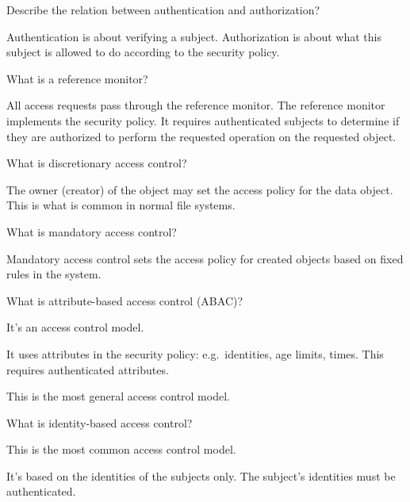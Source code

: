 \question[3] Describe the relation between authentication and authorization?

\begin{solution}
  Authentication is about verifying a subject.
  Authorization is about what this subject is allowed to do according to the 
  security policy.
\end{solution}


\question[3] What is a reference monitor?

\begin{solution}
  All access requests pass through the reference monitor.
  The reference monitor implements the security policy.
  It requires authenticated subjects to determine if they are authorized to 
  perform the requested operation on the requested object.
\end{solution}


\question[3] What is discretionary access control?

\begin{solution}
  The owner (creator) of the object may set the access policy for the data 
  object.
  This is what is common in normal file systems.
\end{solution}


\question[3] What is mandatory access control?

\begin{solution}
  Mandatory access control sets the access policy for created objects based on 
  fixed rules in the system.
\end{solution}


\question[3] What is attribute-based access control (ABAC)?

\begin{solution}
  It's an access control model.

  It uses attributes in the security policy: e.g.\ identities, age limits, 
  times.
  This requires authenticated attributes.

  This is the most general access control model.
\end{solution}


\question[3] What is identity-based access control?

\begin{solution}
  This is the most common access control model.

  It's based on the identities of the subjects only.
  The subject's identities must be authenticated.
\end{solution}

